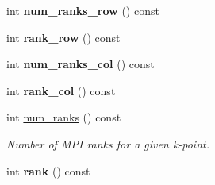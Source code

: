 \begin{DoxyCompactItemize}
\item 
\hypertarget{classsirius_1_1_k__point_a5aca46864fbd5afec4cb3cc3c539aeb1}{}int {\bfseries num\+\_\+ranks\+\_\+row} () const \label{classsirius_1_1_k__point_a5aca46864fbd5afec4cb3cc3c539aeb1}

\item 
\hypertarget{classsirius_1_1_k__point_ac92beddfa6a00eecf29413334283e72b}{}int {\bfseries rank\+\_\+row} () const \label{classsirius_1_1_k__point_ac92beddfa6a00eecf29413334283e72b}

\item 
\hypertarget{classsirius_1_1_k__point_aa64d1d8f8b2c463b7d6e546f28f8047c}{}int {\bfseries num\+\_\+ranks\+\_\+col} () const \label{classsirius_1_1_k__point_aa64d1d8f8b2c463b7d6e546f28f8047c}

\item 
\hypertarget{classsirius_1_1_k__point_afc6efdbdcf85cf84f4c3c0cad2157d44}{}int {\bfseries rank\+\_\+col} () const \label{classsirius_1_1_k__point_afc6efdbdcf85cf84f4c3c0cad2157d44}

\item 
int \hyperlink{classsirius_1_1_k__point_a4fe79c4766bfbe1a6282b6d4943e83df}{num\+\_\+ranks} () const 
\begin{DoxyCompactList}\small\item\em Number of M\+P\+I ranks for a given k-\/point. \end{DoxyCompactList}\item 
\hypertarget{classsirius_1_1_k__point_ae05188775f6136f5c51c8e19bbbe5a26}{}int {\bfseries rank} () const \label{classsirius_1_1_k__point_ae05188775f6136f5c51c8e19bbbe5a26}


\end{DoxyCompactItemize}
